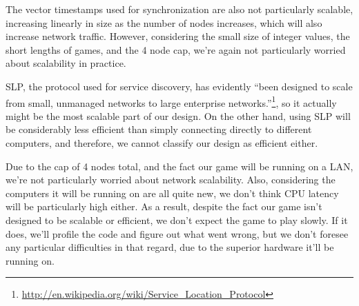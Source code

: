\documentclass[12pt]{article}
\begin{document}
The vector timestamps used for synchronization are also not particularly scalable, increasing linearly in size as the number of nodes increases, which will also increase network traffic.  However, considering the small size of integer values, the short lengths of games, and the 4 node cap, we're again not particularly worried about scalability in practice.

SLP, the protocol used for service discovery, has evidently ``been designed to scale from small, unmanaged networks to large enterprise networks.''\footnote{\url{http://en.wikipedia.org/wiki/Service_Location_Protocol}}, so it actually might be the most scalable part of our design.  On the other hand, using SLP will be considerably less efficient than simply connecting directly to different computers, and therefore, we cannot classify our design as efficient either.

Due to the cap of 4 nodes total, and the fact our game will be running on a LAN, we're not particularly worried about network scalability.  Also, considering the computers it will be running on are all quite new, we don't think CPU latency will be particularly high either.  As a result, despite the fact our game isn't designed to be scalable or efficient, we don't expect the game to play slowly.  If it does, we'll profile the code and figure out what went wrong, but we don't foresee any particular difficulties in that regard, due to the superior hardware it'll be running on.   
\end{document}
